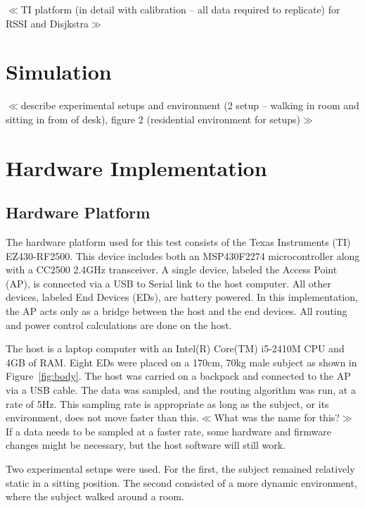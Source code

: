 \documentclass{article}
\begin{document}
$\ll$TI platform (in detail with calibration – all data required to replicate) for RSSI and Disjkstra$\gg$


\section{Simulation}
$\ll$describe experimental setups and environment (2 setup – walking in room and sitting in from of desk), figure 2 (residential environment for setups)$\gg$

\section{Hardware Implementation}
\subsection{Hardware Platform}
The hardware platform used for this test consists of the Texas Instruments (TI) EZ430-RF2500. This device includes both an MSP430F2274 microcontroller along with a CC2500 2.4GHz transceiver. A single device, labeled the Access Point (AP), is connected via a USB to Serial link to the host computer. All other devices, labeled End Devices (EDs), are battery powered. In this implementation, the AP acts only as a bridge between the host and the end devices. All routing and power control calculations are done on the host.

The host is a laptop computer with an Intel(R) Core(TM) i5-2410M CPU and 4GB of RAM. Eight EDs were placed on a 170cm, 70kg male subject as shown in Figure~\ref{fig:body}. The host was carried on a backpack and connected to the AP via a USB cable. The data was sampled, and the routing algorithm was run, at a rate of 5Hz. This sampling rate is appropriate as long as the subject, or its environment, does not move faster than this.$\ll$What was the name for this?$\gg$ If a data needs to be sampled at a faster rate, some hardware and firmware changes might be necessary, but the host software will still work.

Two experimental setups were used. For the first, the subject remained relatively static in a sitting position. The second consisted of a more dynamic environment, where the subject walked around a room.
\end{document}

